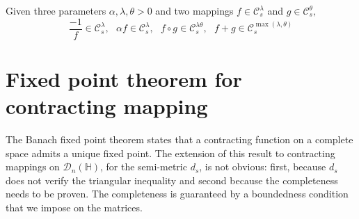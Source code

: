 \documentclass[ECP, preprint]{ejpecp} %
\begin{document}
\begin{proposition}
    Given three parameters $\alpha,\lambda,\theta>0$ and two mappings $f\in \mathcal{C}^{\lambda}_s$ and $g\in \mathcal{C}^{\theta}_s,$
\begin{equation*}
    \frac{-1}{f}\in \mathcal{C}^{\lambda}_s,\ \ \ \alpha f\in \mathcal{C}^{\lambda}_s,\ \ \ f\circ g\in \mathcal{C}^{\lambda\theta}_s, \ \ \ f+g \in \mathcal{C}^{\max(\lambda,\theta)}_s
\end{equation*}
    
\end{proposition}


\section{Fixed point theorem for contracting mapping}

The Banach fixed point theorem states that a contracting function on a complete space admits a unique fixed point. The extension of this result to contracting mappings on $\mathcal{D}_n(\mathbb{H})$, for the semi-metric $d_s$, is not obvious: first, because $d_s$ does not verify the triangular inequality and second because the completeness needs to be proven. The completeness is guaranteed by a boundedness condition that we impose on the matrices.

\end{document}
